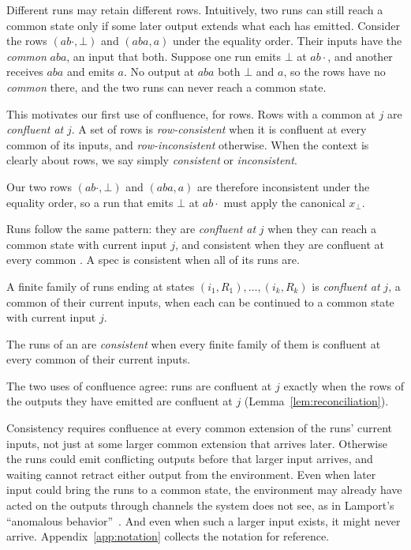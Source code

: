 Different runs may retain different rows.  Intuitively, two runs can still
reach a common state only if some later output extends what each has emitted.
Consider the rows $(ab\cdot,\bot)$ and $(aba,a)$ under the equality order.
Their inputs have the \emph{common \indesc} $aba$, an input that \inrel both.
Suppose one run emits $\bot$ at $ab\cdot$, and another receives $aba$ and
emits $a$.  No output at $aba$ \outrel both $\bot$ and $a$, so the rows have
no \emph{common \outnoun} there, and the two runs can never reach a common
state.

This motivates our first use of confluence, for rows.  Rows with a common
\outnoun at $j$ are \emph{confluent at} $j$.  A set of rows is
\emph{row-consistent} when it is confluent at every common \indesc of its
inputs, and \emph{row-inconsistent} otherwise.  When the context is clearly
about rows, we say simply \emph{consistent} or \emph{inconsistent}.

Our two rows $(ab\cdot,\bot)$ and $(aba,a)$ are therefore inconsistent under the
equality order, so a run that emits $\bot$ at $ab\cdot$ must apply the canonical \commitment $x_\bot$.

Runs follow the same pattern: they are \emph{confluent at} $j$ when they can
reach a common state with current input $j$, and consistent when they are
confluent at every common \indesc.  A spec is consistent when all of its
runs are.

\begin{definition}
\label{def:confluence}
A finite family of runs ending at states $(i_1,R_1),\ldots,(i_k,R_k)$ is \emph{confluent at} $j$, a common \indesc of their current inputs, when each can be continued to a common state with current input $j$.
\end{definition}

\begin{definition}
\label{def:consistency}
The runs of an \spectype are \emph{consistent} when every finite family of
them is confluent at every common \indesc of their current inputs.
\end{definition}

The two uses of confluence agree: runs are confluent at $j$ exactly when the
rows of the outputs they have emitted are confluent at $j$
(Lemma~\ref{lem:reconciliation}).

Consistency requires confluence at every common extension of the runs' current
inputs, not just at some larger common extension that arrives later.  Otherwise
the runs could emit conflicting outputs before that larger input arrives, and
waiting cannot retract either output from the environment.  Even when later
input could bring the runs to a common state, the environment may already have
acted on the outputs through channels the system does not see, as in Lamport's
``anomalous behavior''~\cite{lamport1978time}.  And even when such a larger
input exists, it might never arrive.  Appendix~\ref{app:notation} collects the
notation for reference.


